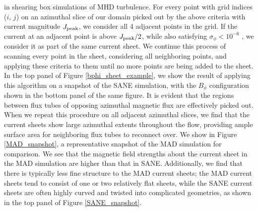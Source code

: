 in shearing box simulations of MHD turbulence. For every point with grid indices ($i$, $j$) on an azimuthal slice of
our domain picked out by the above criteria with current
magnitude $J_{\rm{peak}}$, we consider all 4 adjacent points in the
grid. If the current at an adjacent point is above $J_{\rm{peak}}/2$,
while also satisfying $\sigma_{\phi}<10^{-6}$
, we consider it as part
of the same current sheet. We continue this process of
scanning every point in the sheet, considering all neighboring points, and applying these criteria to them until
no more points are being added to the sheet.
In the top panel of Figure \ref{bphi_sheet_example}, we show the result of
applying this algorithm on a snapshot of the SANE simulation, with the $B_{\phi}$ configuration shown in the bottom
panel of the same figure. It is evident that the regions
between flux tubes of opposing azimuthal magnetic flux
are effectively picked out. When we repeat this procedure on all adjacent azimuthal slices, we find that the
current sheets show large azimuthal extents throughout
the flow, providing ample surface area for neighboring
flux tubes to reconnect over.  We show in Figure \ref{MAD_snapshot}, a representative
snapshot of the MAD simulation for comparison. We see that
the magnetic field strengths about the current sheet in the MAD
simulation are higher than that in SANE. Additionally, we find
that there is typically less fine structure to the MAD current
sheets; the MAD current sheets tend to consist of one or two
relatively flat sheets, while the SANE current sheets are often
highly curved and twisted into complicated geometries, as
shown in the top panel of Figure \ref{SANE_snapshot}.

